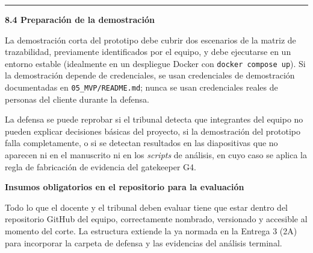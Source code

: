 \documentclass[11pt,a4paper]{article}
\newcounter{secc}
\newcommand{\secband}[1]{%
    \stepcounter{secc}\par\vspace{9pt}\noindent
    {\setlength{\fboxsep}{0pt}%
        \colorbox{uteqgold}{\parbox[c][20pt][c]{0.05\textwidth}{\centering\textbf{\color{white}\small \arabic{secc}}}}%
        \colorbox{uteqgreen}{\parbox[c][20pt][c]{0.95\textwidth}{\hspace{8pt}\textbf{\color{white}\small #1}}}%
    }\par\vspace{5pt}}
\newcommand{\submark}[1]{\par\vspace{4pt}\noindent
    {\color{uteqgreen}\rule[-1pt]{3.5pt}{12pt}}\hspace{6pt}\textbf{\color{uteqgreen}#1}\par\vspace{2pt}}
\begin{document}
\submark{8.4 Preparación de la demostración}
La demostración corta del prototipo debe cubrir dos escenarios de la matriz de trazabilidad, previamente identificados por el equipo, y debe ejecutarse en un entorno estable (idealmente en un despliegue Docker con \texttt{docker compose up}).
Si la demostración depende de credenciales, se usan credenciales de demostración documentadas en \texttt{05\_MVP/README.md}; nunca se usan credenciales reales de personas del cliente durante la defensa.

\begin{alertbox}[title=Advertencia sobre la defensa]
    La defensa se puede reprobar si el tribunal detecta que integrantes del equipo no pueden explicar decisiones básicas del proyecto, si la demostración del prototipo falla completamente, o si se detectan resultados en las diapositivas que no aparecen ni en el manuscrito ni en los \emph{scripts} de análisis, en cuyo caso se aplica la regla de fabricación de evidencia del gatekeeper G4.
\end{alertbox}

\secband{Insumos obligatorios en el repositorio para la evaluación}

Todo lo que el docente y el tribunal deben evaluar tiene que estar dentro del repositorio GitHub del equipo, correctamente nombrado, versionado y accesible al momento del corte.
La estructura extiende la ya normada en la Entrega 3 (2A) para incorporar la carpeta de defensa y las evidencias del análisis terminal.
\end{document}
